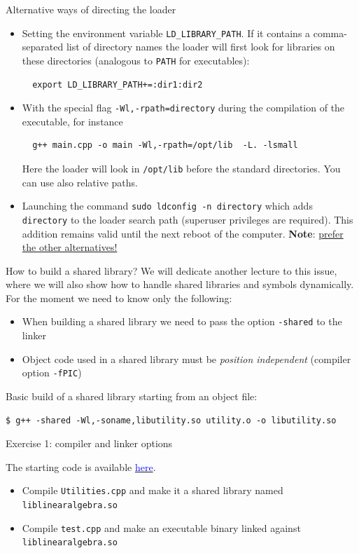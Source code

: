 \documentclass[10pt,aspectratio=169]{beamer}
\begin{document}
\begin{frame}[fragile]{Alternative ways of directing the loader}
  \begin{itemize}
  \item Setting the environment variable \texttt{LD\_LIBRARY\_PATH}. If
    it contains a comma-separated list of directory names the
    loader will first look for libraries on these directories (analogous to \texttt{PATH} for executables):
\begin{verbatim}
  export LD_LIBRARY_PATH+=:dir1:dir2
\end{verbatim}
\item With the special flag \texttt{-Wl,-rpath=directory}
  during the compilation of the executable, for instance
\begin{verbatim}
  g++ main.cpp -o main -Wl,-rpath=/opt/lib  -L. -lsmall
\end{verbatim}
Here the loader will look in \texttt{/opt/lib} before the standard directories. You can use also relative paths.
\item Launching the command \texttt{sudo ldconfig -n directory} which adds \texttt{directory} to the loader search path (superuser privileges are required). This addition remains valid until the next reboot of the computer. \textbf{Note}: \underline{prefer the other alternatives!}
  \end{itemize}
\end{frame}

\begin{frame}[fragile]{How to build a shared library?}
  We will dedicate another lecture to this issue, where we will also show how to handle shared libraries and symbols dynamically.
  For the moment we need to know only the following:
  \begin{itemize}
  \item When building a shared library we need to pass the option \texttt{-shared} to the linker
  \item Object code used in a shared library must be \emph{position independent} (compiler option \texttt{-fPIC})
  \end{itemize}

  Basic build of a shared library starting from an object file:
\begin{verbatim}
$ g++ -shared -Wl,-soname,libutility.so utility.o -o libutility.so
\end{verbatim}
\end{frame}

\begin{frame}{Exercise 1: compiler and linker options}
	
  The starting code is available \href{https://github.com/pacs-course/pacs-Labs/tree/main/Labs/2024/02-compile/src}{ \textcolor{blue}{here}}.	
  \begin{itemize}
  \item Compile \texttt{Utilities.cpp} and make it a shared library named \texttt{liblinearalgebra.so}
  \item Compile \texttt{test.cpp} and make an executable binary linked against \texttt{liblinearalgebra.so}
  \end{itemize}
   
  
\end{frame}
\end{document}
